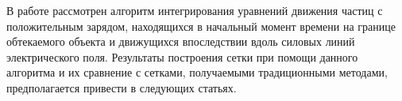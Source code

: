 \documentclass[a4paper,12pt]{article}
\begin{document}
В работе рассмотрен алгоритм интегрирования уравнений движения частиц с положительным зарядом, находящихся в начальный момент времени на границе обтекаемого объекта и движущихся впоследствии вдоль силовых линий электрического поля. Результаты построения сетки при помощи данного алгоритма и их сравнение с сетками, получаемыми традиционными методами, предполагается привести в следующих статьях.

\end{document}
